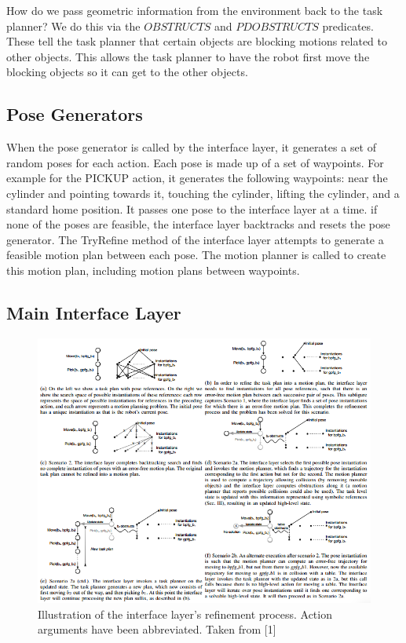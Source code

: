 \documentclass[12pt]{article}
\begin{document}
How do we pass geometric information from the environment back to the task planner?  
We do this via the $OBSTRUCTS$ and $PDOBSTRUCTS$ predicates.  
These tell the task planner that certain objects are blocking motions related to other objects.  
This allows the task planner to have the robot first move the blocking objects so it can get to the other objects.


\subsection{Pose Generators}

When the pose generator is called by the interface layer, it generates a set of random poses for each action. Each pose is made up of a set of waypoints. For example for the PICKUP action, it generates the following waypoints: near the cylinder and pointing towards it, touching the cylinder, lifting the cylinder, and a standard home position. It passes one pose to the interface layer at a time.  if none of the poses are feasible, the interface layer backtracks and resets the pose generator. The TryRefine method of the interface layer attempts to generate a feasible motion plan between each pose.  The motion planner is called to create this motion plan, including motion plans between waypoints.

\subsection{Main Interface Layer}

\begin{figure}[t]
\centering
\includegraphics[width=\textwidth]{figures/figure4.png}
\caption{Illustration of the interface layer’s refinement process. Action arguments have been abbreviated. Taken from [1]
\label{fig:figure4}}
\end{figure}
\end{document}
